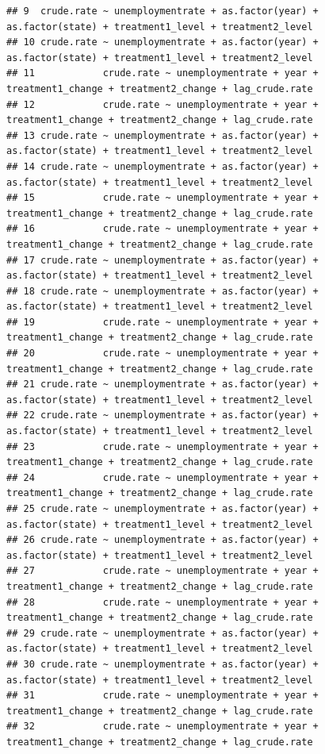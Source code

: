 \documentclass[
]{article}
\begin{document}
\begin{verbatim}
## 9  crude.rate ~ unemploymentrate + as.factor(year) + as.factor(state) + treatment1_level + treatment2_level
## 10 crude.rate ~ unemploymentrate + as.factor(year) + as.factor(state) + treatment1_level + treatment2_level
## 11            crude.rate ~ unemploymentrate + year + treatment1_change + treatment2_change + lag_crude.rate
## 12            crude.rate ~ unemploymentrate + year + treatment1_change + treatment2_change + lag_crude.rate
## 13 crude.rate ~ unemploymentrate + as.factor(year) + as.factor(state) + treatment1_level + treatment2_level
## 14 crude.rate ~ unemploymentrate + as.factor(year) + as.factor(state) + treatment1_level + treatment2_level
## 15            crude.rate ~ unemploymentrate + year + treatment1_change + treatment2_change + lag_crude.rate
## 16            crude.rate ~ unemploymentrate + year + treatment1_change + treatment2_change + lag_crude.rate
## 17 crude.rate ~ unemploymentrate + as.factor(year) + as.factor(state) + treatment1_level + treatment2_level
## 18 crude.rate ~ unemploymentrate + as.factor(year) + as.factor(state) + treatment1_level + treatment2_level
## 19            crude.rate ~ unemploymentrate + year + treatment1_change + treatment2_change + lag_crude.rate
## 20            crude.rate ~ unemploymentrate + year + treatment1_change + treatment2_change + lag_crude.rate
## 21 crude.rate ~ unemploymentrate + as.factor(year) + as.factor(state) + treatment1_level + treatment2_level
## 22 crude.rate ~ unemploymentrate + as.factor(year) + as.factor(state) + treatment1_level + treatment2_level
## 23            crude.rate ~ unemploymentrate + year + treatment1_change + treatment2_change + lag_crude.rate
## 24            crude.rate ~ unemploymentrate + year + treatment1_change + treatment2_change + lag_crude.rate
## 25 crude.rate ~ unemploymentrate + as.factor(year) + as.factor(state) + treatment1_level + treatment2_level
## 26 crude.rate ~ unemploymentrate + as.factor(year) + as.factor(state) + treatment1_level + treatment2_level
## 27            crude.rate ~ unemploymentrate + year + treatment1_change + treatment2_change + lag_crude.rate
## 28            crude.rate ~ unemploymentrate + year + treatment1_change + treatment2_change + lag_crude.rate
## 29 crude.rate ~ unemploymentrate + as.factor(year) + as.factor(state) + treatment1_level + treatment2_level
## 30 crude.rate ~ unemploymentrate + as.factor(year) + as.factor(state) + treatment1_level + treatment2_level
## 31            crude.rate ~ unemploymentrate + year + treatment1_change + treatment2_change + lag_crude.rate
## 32            crude.rate ~ unemploymentrate + year + treatment1_change + treatment2_change + lag_crude.rate

\end{verbatim}
\end{document}
